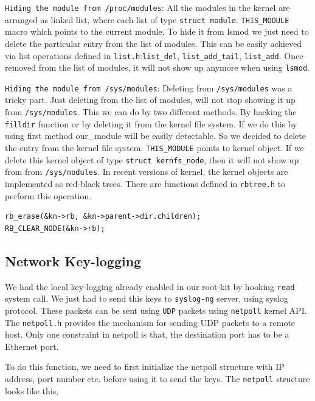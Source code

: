 \documentclass[10pt, letterpaper]{scrartcl}
\begin{document}
\texttt{Hiding the module from /proc/modules}: All the modules in the kernel are arranged as linked list, 
where each list of type \texttt{struct module}. \texttt{THIS\_MODULE} macro which points to the current module. 
To hide it from lsmod we just need to delete the particular entry from the list of modules. 
This can be easily achieved via list operations defined in \texttt{list.h}:\texttt{list\_del}, 
\texttt{list\_add\_tail}, \texttt{list\_add}. Once removed from the list of modules, 
it will not show up anymore when using \texttt{lsmod}. 

\texttt{Hiding the module from /sys/modules}: Deleting from \texttt{/sys/modules} was a tricky part. 
Just deleting from the list of modules, will not stop showing it up from \texttt{/sys/modules}.
This we can do by two different methods. By hacking the \texttt{filldir} function or by deleting it from the 
kernel file system. If we do this by using first method our\_module will be easily detectable. 
So we decided to delete the entry from the kernel file system. \texttt{THIS\_MODULE} points to kernel object. 
If we delete this kernel object of type \texttt{struct kernfs\_node}, then it will not show up from from \texttt{/sys/modules}. 
In recent versions of kernel, the kernel objects are implemented as red-black trees. 
There are functions defined in \texttt{rbtree.h} to perform this operation. 

\begin{verbatim}
rb_erase(&kn->rb, &kn->parent->dir.children);
RB_CLEAR_NODE(&kn->rb);
\end{verbatim}


\subsection{Network Key-logging}
We had the local key-logging already enabled in our root-kit by hooking \texttt{read} system call. 
We just had to send this keys to \texttt{syslog-ng} server, using syslog protocol. 
These packets can be sent using \texttt{UDP} packets using \texttt{netpoll} kernel API. 
The \texttt{netpoll.h} provides the mechanism for sending UDP packets to a remote host. 
Only one constraint in netpoll is that, the destination port has to be a Ethernet port. 

To do this function, we need to first initialize the netpoll structure with IP address, port number etc. 
before using it to send the keys. 
The \texttt{netpoll} structure looks like this, 
\end{document}
